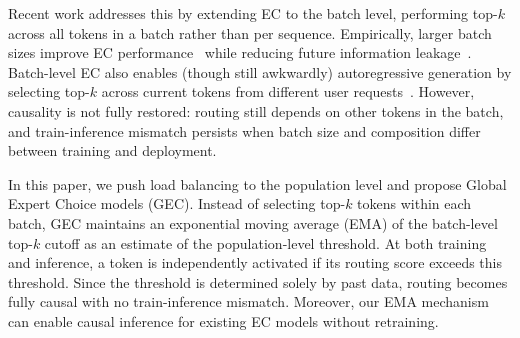 \documentclass{article}
\theoremstyle{plain}
\theoremstyle{definition}
\theoremstyle{remark}
\begin{document}
Recent work addresses this by extending EC to the batch level, performing top-$k$ across all tokens in a batch rather than per sequence.
Empirically, larger batch sizes improve EC performance~\cite{ni2025openmoe2, shi2025diffmoe} while reducing future information leakage~\cite{wang2024auxiliarylossfreeloadbalancingstrategy}.
Batch-level EC also enables (though still awkwardly) autoregressive generation by selecting top-$k$ across current tokens from different user requests~\cite{ludziejewski2024scaling}.
However, causality is not fully restored: routing still depends on other tokens in the batch, and train-inference mismatch persists when batch size and composition differ between training and deployment. 

In this paper, we push load balancing to the population level and propose Global Expert Choice models (GEC). Instead of selecting top-$k$ tokens within each batch, GEC maintains an exponential moving average (EMA) of the batch-level top-$k$ cutoff as an estimate of the population-level threshold. At both training and inference, a token is independently activated if its routing score exceeds this threshold. Since the threshold is determined solely by past data, routing becomes fully causal with no train-inference mismatch. Moreover, our EMA mechanism can enable causal inference for existing EC models without retraining. 

\end{document}
